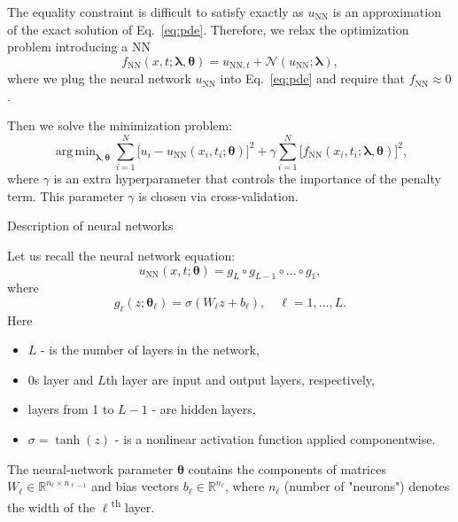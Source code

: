 \documentclass{beamer}
\renewcommand{\vec}[1]{\boldsymbol{#1}}
\newcommand{\VTheta}{\ensuremath{\vec{\theta}}}
\newcommand{\VLambda}{\ensuremath{\vec{\lambda}}}
\DeclareMathOperator*{\argmin}{arg\,min}
\newcommand{\R}{\mathbb R}
\newcommand{\UNN}[1][\text{NN}]{u_{#1}}
\newcommand{\FNN}[1][\text{NN}]{f_{#1}}
\newcommand{\NonlinOp}{\mathcal N\!}
\begin{document}
\begin{frame}
The equality constraint is difficult to satisfy exactly as
$u_{\text{NN}}$ is an approximation of the exact solution of
Eq.~\eqref{eq:pde}.
Therefore, we relax the optimization problem introducing a NN
\begin{equation*}
    \FNN(x, t; \VLambda, \VTheta) =
        u_{\text{NN}, t} + \NonlinOp(u_{\text{NN}}; \VLambda),
\end{equation*}
where we plug the neural network $\UNN$ into Eq.~\eqref{eq:pde} and
require that $\FNN \approx 0$.

Then we solve the minimization problem:
\begin{equation*}
    \argmin_{\VLambda, \VTheta}
    \sum_{i=1}^N \big[ u_i - \UNN(x_i, t_i; \VTheta)\big ]^2
    +\gamma \sum_{i=1}^N \big[ \FNN(x_i, t_i; \VLambda, \VTheta) \big]^2,
\end{equation*}
where $\gamma$ is an extra hyperparameter that controls the importance of the
penalty term.
This parameter $\gamma$ is chosen via cross-validation.
    
\end{frame}

\begin{frame}{Description of neural networks}
    
Let us recall the neural network equation:
$$
\UNN(x, t; \vec{\theta}) = g_L \circ g_{L-1} \circ \dots \circ g_1,
$$
where
\[
    g_\ell(z; \VTheta_\ell) = \sigma (W_\ell z + b_\ell), \quad \ell = 1,\dots,L.
\]
Here 
\begin{itemize}
    \item $L$  - is the number of layers in the network,
    \item 0s layer and $L$th layer are input and output layers, respectively,
    \item layers from 1 to $L-1$ - are hidden layers,
    \item $\sigma = \tanh (z) $ - is a nonlinear activation function applied componentwise.
\end{itemize} 
 
The neural-network parameter $\VTheta$ contains the components of matrices
$W_\ell \in \R^{n_{\ell}\times n_{\ell-1}}$ and bias vectors
$b_\ell \in \R^{n_\ell}$, where $n_\ell$  (number of "neurons") denotes the width of the
$\ell$\textsuperscript{th} layer.
    
\end{frame}
\end{document}
